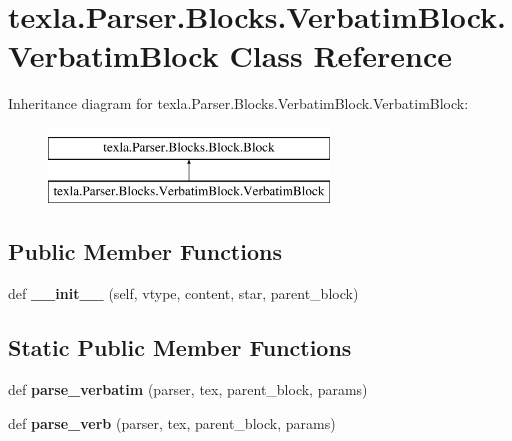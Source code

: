 \hypertarget{classtexla_1_1Parser_1_1Blocks_1_1VerbatimBlock_1_1VerbatimBlock}{}\section{texla.\+Parser.\+Blocks.\+Verbatim\+Block.\+Verbatim\+Block Class Reference}
\label{classtexla_1_1Parser_1_1Blocks_1_1VerbatimBlock_1_1VerbatimBlock}
Inheritance diagram for texla.\+Parser.\+Blocks.\+Verbatim\+Block.\+Verbatim\+Block\+:\begin{figure}[H]
\begin{center}
\leavevmode
\includegraphics[height=2.000000cm]{classtexla_1_1Parser_1_1Blocks_1_1VerbatimBlock_1_1VerbatimBlock}
\end{center}
\end{figure}
\subsection*{Public Member Functions}
\begin{DoxyCompactItemize}
\item 
\hypertarget{classtexla_1_1Parser_1_1Blocks_1_1VerbatimBlock_1_1VerbatimBlock_a5945561c3968be307e655f7e8a5fbe17}{}\label{classtexla_1_1Parser_1_1Blocks_1_1VerbatimBlock_1_1VerbatimBlock_a5945561c3968be307e655f7e8a5fbe17} 
def {\bfseries \+\_\+\+\_\+init\+\_\+\+\_\+} (self, vtype, content, star, parent\+\_\+block)
\end{DoxyCompactItemize}
\subsection*{Static Public Member Functions}
\begin{DoxyCompactItemize}
\item 
\hypertarget{classtexla_1_1Parser_1_1Blocks_1_1VerbatimBlock_1_1VerbatimBlock_a7f397763341d83e66f26c22b65b6d0cc}{}\label{classtexla_1_1Parser_1_1Blocks_1_1VerbatimBlock_1_1VerbatimBlock_a7f397763341d83e66f26c22b65b6d0cc} 
def {\bfseries parse\+\_\+verbatim} (parser, tex, parent\+\_\+block, params)
\item 
\hypertarget{classtexla_1_1Parser_1_1Blocks_1_1VerbatimBlock_1_1VerbatimBlock_a2ff4ceb844ad660cf5304330d1e715e2}{}\label{classtexla_1_1Parser_1_1Blocks_1_1VerbatimBlock_1_1VerbatimBlock_a2ff4ceb844ad660cf5304330d1e715e2} 
def {\bfseries parse\+\_\+verb} (parser, tex, parent\+\_\+block, params)
\end{DoxyCompactItemize}
